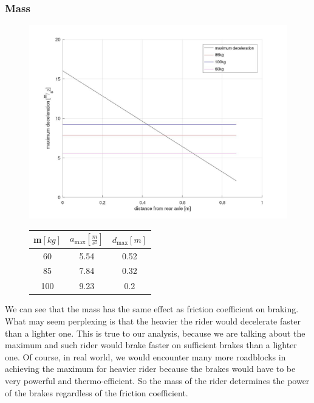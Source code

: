 \documentclass[12pt, a4]{article}
\begin{document}
\subsubsection{Mass}
\begin{figure}[H]
\begin{minipage}[t]{.6\linewidth}
\vspace{0pt}
\includegraphics[width = \linewidth]{mass_on_braking}
\end{minipage}%
\begin{minipage}[t]{0.4\linewidth}
\vspace{0pt}
\centering
\begin{tabular}{|c | c | c|} 
\hline
 m$[kg]$ & $a_{\max} [\frac{m}{s^2}]$ & $d_{\max}[m]$ \\ [0.5ex] 
\hline\hline
60 & 5.54  & 0.52 \\ [1ex] 
85 & 7.84 & 0.32 \\ [1ex]
100 & 9.23 & 0.2 \\ [1ex]
\hline
\end{tabular}
\end{minipage}%
\caption{}%
\label{mass_on_braking}
\end{figure}
We can see that the mass has the same effect as friction coefficient on braking. What may seem perplexing is that the 
heavier the rider would decelerate faster than a lighter one. This is true to our analysis, because we are talking about the 
maximum and such rider would brake faster on sufficient brakes than a lighter one. Of course, in real world, we would encounter
many more roadblocks in achieving the maximum for heavier rider because the brakes would have to be very powerful and 
thermo-efficient. So the mass of the rider determines the power of the brakes regardless of the friction coefficient.
\end{document}
